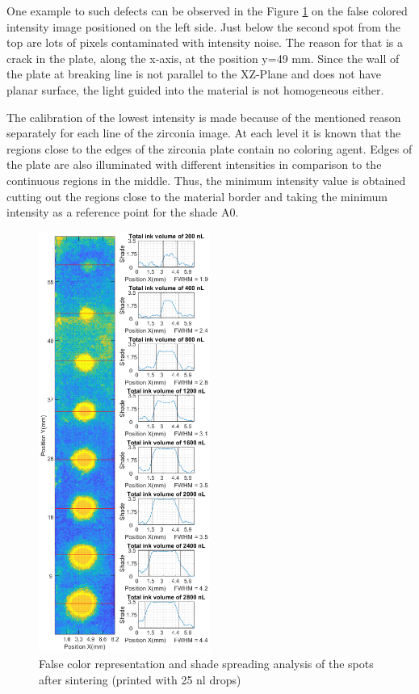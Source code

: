 One example to such defects can be observed in the Figure \ref{fig:drops25} on the false colored intensity image positioned on the left side. Just below the second spot from the top are lots of pixels contaminated with intensity noise. The reason for that is a crack in the plate, along the x-axis, at the position y=49 mm. Since the wall of the plate at breaking line is not parallel to the XZ-Plane and does not have planar surface, the light guided into the material is not homogeneous either. 

The calibration of the lowest intensity is made because of the mentioned reason separately for each line of the zirconia image. At each level it is known that the regions close to the edges of the zirconia plate contain no coloring agent. Edges of the plate are also illuminated with different intensities in comparison to the continuous regions in the middle. Thus, the minimum intensity value is obtained cutting out the regions close to the material border and taking  the minimum intensity as a reference point for the shade A0.
\bigskip

\begin{figure}[H]
	\centering
	\includegraphics[width=0.5\textwidth]{grafiken/drops25.eps}
	\caption{False color representation and shade spreading analysis of the spots after sintering (printed with 25 nl drops)}
	\label{fig:drops25}
\end{figure} 

